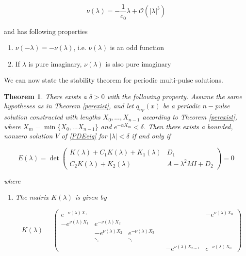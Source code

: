 \documentclass[12pt]{article}
\newtheorem{theorem}{Theorem}
\begin{document}
\begin{equation}\label{nulambda}
\nu(\lambda) = -\frac{1}{c_0} \lambda + \mathcal{O}(|\lambda|^3)
\end{equation}

and has following properties

\begin{enumerate}
\item $\nu(-\lambda) = -\nu(\lambda)$, i.e. $\nu(\lambda)$ is an odd function 
\item If $\lambda$ is pure imaginary, $\nu(\lambda)$ is also pure imaginary
\end{enumerate}

We can now state the stability theorem for periodic multi-pulse solutions. 

\begin{theorem}\label{blockmatrixtheorem}
There exists a $\delta > 0$ with the following property. Assume the same hypotheses as in Theorem \ref{perexist}, and let $q_{np}(x)$ be a periodic $n-$pulse solution constructed with lengths $X_0, \dots, X_{n-1}$ according to Theorem \ref{perexist}, where $X_m = \min\{ X_0, \dots X_{n-1}\}$ and $e^{-\alpha X_m} < \delta$. Then there exists a bounded, nonzero solution $V$ of \eqref{PDEeig} for $|\lambda| < \delta$ if and only if 

\begin{equation}\label{blockeq}
E(\lambda) = \det
\begin{pmatrix}
K(\lambda) + C_1 K(\lambda) + K_1(\lambda) & D_1 \\
C_2 K(\lambda) + K_2(\lambda) & A - \lambda^2 MI + D_2
\end{pmatrix} = 0
\end{equation}

where 

\begin{enumerate}

\item The matrix $K(\lambda)$ is given by

\begin{equation}
K(\lambda) = 
\begin{pmatrix}
e^{-\nu(\lambda)X_1} & & & & & -e^{\nu(\lambda)X_0} \\
-e^{\nu(\lambda)X_1} & e^{-\nu(\lambda)X_2} \\
& -e^{\nu(\lambda)X_2} & e^{-\nu(\lambda)X_3} \\
& \ddots & \ddots & &&  \\
& & & & -e^{\nu(\lambda)X_{n-1}} & e^{-\nu(\lambda)X_0} 
\end{pmatrix}
\end{equation}


\end{enumerate}
\end{theorem}
\end{document}
